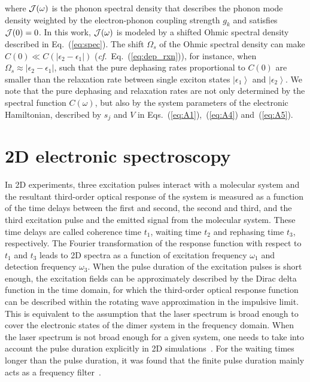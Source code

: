 \documentclass[%
 reprint,%
 amssymb, amsmath,%
 aip,cha,%
]{revtex4-1}
\newcommand{\ket}[1]{\ensuremath{\left|{#1}\right\rangle}}
\begin{document}
 where ${\cal J(\omega)}$ is the phonon spectral density that describes the phonon mode density weighted by the electron-phonon coupling strength $g_k$ and satisfies ${\cal J}(0)=0$. In this work, $\cal{J}(\omega)$ is modeled by a shifted Ohmic spectral density described in Eq.~(\ref{eq:spec}). The shift $\Omega_s$ of the Ohmic spectral density can make $C(0) \ll C\left(\left|\epsilon_2-\epsilon_1\right|\right)$ ({\it cf.}~Eq.~(\ref{eq:dep_rxn})), for instance, when $\Omega_s\approx\left|\epsilon_2-\epsilon_1\right|$, such that the pure dephasing rates proportional to $C(0)$ are smaller than the relaxation rate between single exciton states $\ket{\epsilon_1}$ and $\ket{\epsilon_2}$.  We note that the pure dephasing and relaxation rates are not only determined by the spectral function $C(\omega)$, but also by the system parameters of the electronic Hamiltonian, described by $s_j$ and $V$ in Eqs.~(\ref{eq:A1}),~(\ref{eq:A4}) and~(\ref{eq:A5}).
 
 \section{2D electronic spectroscopy} 
In 2D experiments, three excitation pulses interact with a molecular system and the resultant third-order optical response of the system is measured as a function of the time delays between the first and second, the second and third, and the third excitation pulse and the emitted signal from the molecular system. These time delays are called coherence time $t_1$, waiting time $t_2$ and rephasing time $t_3$, respectively. The Fourier transformation of the response function with respect to $t_1$ and $t_3$ leads to 2D spectra as a function of excitation frequency $\omega_1$ and detection frequency $\omega_3$. When the pulse duration of the excitation pulses is short enough, the excitation fields can be approximately described by the Dirac delta function in the time domain, for which the third-order optical response function can be described within the rotating wave approximation in the impulsive limit. This is equivalent to the assumption that the laser spectrum is broad enough to cover the electronic states of the dimer system in the frequency domain. When the laser spectrum is not broad enough for a given system, one needs to take into account the pulse duration explicitly in 2D simulations~\cite{BrixnerJCP2004}. For the waiting times longer than the pulse duration, it was found that the finite pulse duration mainly acts as a frequency filter~\cite{KjellbergPRB2006}.
\end{document}
